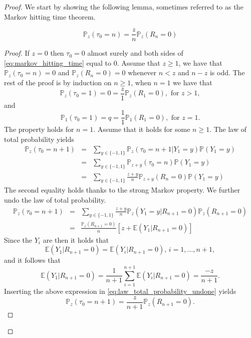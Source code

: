 \begin{proof}
We start by showing the following lemma, sometimes referred to as the Markov hitting time theorem.
\begin{lemma}\label{lem:markov_hitting_time}
\begin{equation}\label{eq:markov_hitting_time}
\mathbb{P}_z(\tau_0 = n) = \frac{z}{n}\mathbb{P}_z(R_n = 0)
\end{equation}
\end{lemma}
\begin{proof}
If $z = 0$ then $\tau_0 = 0$ almost surely and both sides of \eqref{eq:markov_hitting_time} equal to $0$. Assume that $z\geq1$, we have that $\mathbb{P}_z(\tau_0 = n) = 0$ and $\mathbb{P}_z(R_n = 0) = 0$ whenever $n<z$ and $n-z$ is odd. The rest of the proof is by induction on $n\geq1$, when $n = 1$ we have that 
$$
\mathbb{P}_z(\tau_0 = 1) = 0 = \frac{z}{1}\mathbb{P}_z(R_1 = 0),\text{ for }z>1, 
$$
and 
$$\mathbb{P}_1(\tau_0 = 1) = q = \frac{1}{1}\mathbb{P}_1(R_1 = 0),\text{ for }z=1. 
$$
The property holds for $n=1$. Assume that it holds for some $n\geq1$. The law of total probability yields
\begin{eqnarray*}
\mathbb{P}_z(\tau_0 = n+1)&=&\sum_{y\in\{-1,1\}}\mathbb{P}_z(\tau_0 = n+1|Y_1 = y)\mathbb{P}(Y_1 = y)\\
&=&\sum_{y\in\{-1,1\}}\mathbb{P}_{z+y}(\tau_0 = n)\mathbb{P}(Y_1 = y)\\
&=&\sum_{y\in\{-1,1\}}\frac{z+y}{n}\mathbb{P}_{z+y}(R_n = 0)\mathbb{P}(Y_1 = y)
\end{eqnarray*}
The second equality holds thanks to the strong Markov property. We further undo the law of total probability.
\begin{eqnarray}
\mathbb{P}_z(\tau_0 = n+1)&=&\sum_{y\in\{-1,1\}}\frac{z+y}{n}\mathbb{P}_{z}(Y_1 = y|R_{n+1} = 0)\mathbb{P}_z(R_{n+1} = 0)\nonumber\\
&=&\frac{\mathbb{P}_z(R_{n+1} = 0)}{n}\left[z+\mathbb{E}(Y_1|R_{n+1}=0)\right]\label{eq:law_total_probability_undone}
\end{eqnarray}
Since the $Y_i$ are \iid then it holds that 
$$
\mathbb{E}(Y_1|R_{n+1}=0) = \mathbb{E}(Y_i|R_{n+1}=0)\text{, } i = 1, \ldots, n+1,
$$
and it follows that 
$$
\mathbb{E}(Y_1|R_{n+1}=0) = \frac{1}{n+1}\sum_{i =1}^{n+1}\mathbb{E}(Y_i|R_{n+1}=0) = \frac{-z}{n+1}.
$$
Inserting the above expression in \eqref{eq:law_total_probability_undone} yields 
$$
\mathbb{P}_z(\tau_0 = n+1) = \frac{z}{n+1}\mathbb{P}_z(R_{n+1} = 0).
$$
\end{proof}
\begin{remark}

\end{remark}
\end{proof}
